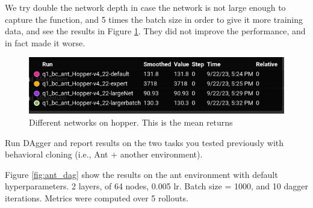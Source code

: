 \documentclass[11pt]{article}
\begin{document}
We try double the network depth in case the network is not large enough to capture the function, 
and 5 times the batch size in order to give it more training data, and see the results in Figure \ref{fig:hop2}.
They did not improve the performance, and in fact made it worse.

\begin{figure}[h] 
    \centering
    \includegraphics[width=0.55 \linewidth]{09-22-hop_all}
    \caption{Different networks on hopper. This is the mean returns}
    \label{fig:hop2}
\end{figure}

Run DAgger and report results on the two tasks you tested previously with behavioral cloning
(i.e., Ant + another environment). 

\soln

Figure \ref{fig:ant_dag} show the results on the ant environment with default hyperparameters.
2 layers, of 64 nodes, 0.005 lr. Batch size = 1000, and 10 dagger iterations. Metrics were computed over 5 rollouts.
\end{document}
